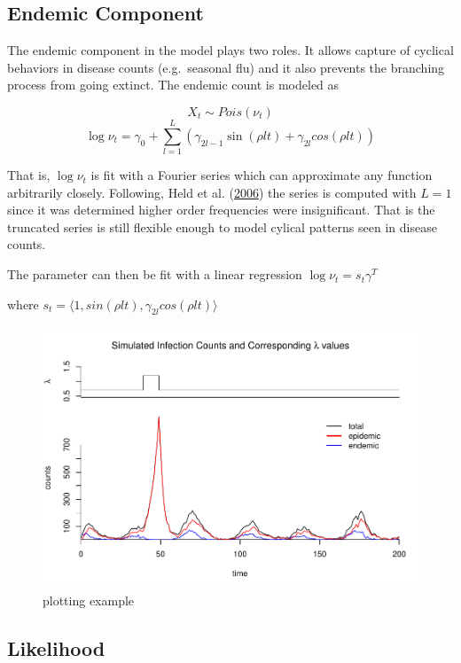 \documentclass[]{article}
\numberwithin{equation}{section}
\begin{document}
\hypertarget{endemic-component}{%
\subsection{Endemic Component}\label{endemic-component}}

The endemic component in the model plays two roles. It allows capture of
cyclical behaviors in disease counts (e.g.~seasonal flu) and it also
prevents the branching process from going extinct. The endemic count is
modeled as

\[X_t \sim Pois(\nu_t)\]
\[\log{\nu_t} = \gamma_0 + \sum_{l = 1}^L (\gamma_{2l-1}\sin(\rho l t)+\gamma_{2l}cos(\rho l t))\]

That is, \(\log{\nu_t}\) is fit with a Fourier series which can
approximate any function arbitrarily closely. Following, Held et al.
(\protect\hyperlink{ref-held_two-component_2006}{2006}) the series is
computed with \(L = 1\) since it was determined higher order frequencies
were insignificant. That is the truncated series is still flexible
enough to model cylical patterns seen in disease counts.

The parameter can then be fit with a linear regression
\(\log{\nu_t} = s_t\gamma^T\)

where
\(s_t = \langle 1, sin(\rho l t), \gamma_{2l}cos(\rho l t) \rangle\)

\begin{figure}
\centering
\includegraphics{thesis_draft_files/figure-latex/simulation figure-1.pdf}
\caption{\label{fig:figs}plotting example}
\end{figure}

\hypertarget{likelihood}{%
\subsection{Likelihood}\label{likelihood}}
\end{document}
